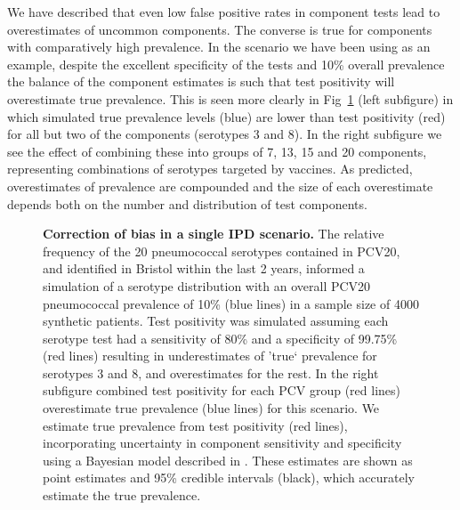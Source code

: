 \documentclass[10pt,letterpaper]{article}
\begin{document}
We have described that even low false positive rates in component tests lead to overestimates of uncommon components. The converse is true for components with comparatively high prevalence. In the scenario we have been using as an example, despite the excellent specificity of the tests and 10\% overall prevalence the balance of the component estimates is such that test positivity will overestimate true prevalence. This is seen more clearly in Fig~\ref{fig5} (left subfigure) in which simulated true prevalence levels (blue) are lower than test positivity (red) for all but two of the components (serotypes 3 and 8). In the right subfigure we see the effect of combining these into groups of 7, 13, 15 and 20 components, representing combinations of serotypes targeted by vaccines. As predicted, overestimates of prevalence are compounded and the size of each overestimate depends both on the number and distribution of test components.

\begin{figure}[hb!]
\caption{{\bf Correction of bias in a single IPD scenario.}
The relative frequency of the 20 pneumococcal serotypes contained in PCV20, and identified in Bristol within the last 2 years, informed a simulation of a serotype distribution with an overall PCV20 pneumococcal prevalence of 10\% (blue lines) in a sample size of 4000 synthetic patients. Test positivity was simulated assuming each serotype test had a sensitivity of 80\% and a specificity of 99.75\% (red lines) resulting in underestimates of 'true` prevalence for serotypes 3 and 8, and overestimates for the rest. In the right subfigure combined test positivity for each PCV group (red lines) overestimate true prevalence (blue lines) for this scenario. We estimate true prevalence from test positivity (red lines), incorporating uncertainty in component sensitivity and specificity using a Bayesian model described in . These estimates are shown as point estimates and 95\% credible intervals (black), which accurately estimate the true prevalence.}
\label{fig5}
\end{figure}
\end{document}
